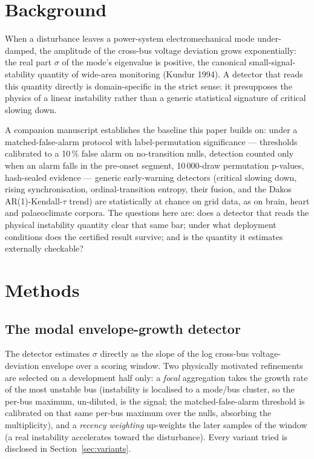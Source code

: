 \documentclass[journal]{IEEEtran}
\begin{document}
\IEEEpeerreviewmaketitle

\section{Background}\label{sec:background}

When a disturbance leaves a power-system electromechanical mode
under-damped, the amplitude of the cross-bus voltage deviation grows
exponentially: the real part $\sigma$ of the mode's eigenvalue is
positive, the canonical small-signal-stability quantity of wide-area
monitoring (Kundur 1994). A detector that reads this quantity directly
is domain-specific in the strict sense: it presupposes the physics of a
linear instability rather than a generic statistical signature of
critical slowing down.

A companion manuscript establishes the baseline this paper builds on:
under a matched-false-alarm protocol with label-permutation
significance --- thresholds calibrated to a 10\,\% false alarm on
no-transition nulls, detection counted only when an alarm falls in the
pre-onset segment, 10\,000-draw permutation p-values, hash-sealed
evidence --- generic early-warning detectors (critical slowing down,
rising synchronisation, ordinal-transition entropy, their fusion, and
the Dakos AR(1)-Kendall-$\tau$ trend) are statistically at chance on
grid data, as on brain, heart and palaeoclimate corpora. The questions
here are: does a detector that reads the physical instability quantity
clear that same bar; under what deployment conditions does the
certified result survive; and is the quantity it estimates externally
checkable?

\section{Methods}\label{sec:methods}

\subsection{The modal envelope-growth detector}

The detector estimates $\sigma$ directly as the slope of the log
cross-bus voltage-deviation envelope over a scoring window. Two
physically motivated refinements are selected on a development half
only: a \emph{focal} aggregation takes the growth rate of the most
unstable bus (instability is localised to a mode/bus cluster, so the
per-bus maximum, un-diluted, is the signal; the matched-false-alarm
threshold is calibrated on that same per-bus maximum over the nulls,
absorbing the multiplicity), and a \emph{recency weighting} up-weights
the later samples of the window (a real instability accelerates toward
the disturbance). Every variant tried is disclosed in
Section~\ref{sec:variants}.
\end{document}
